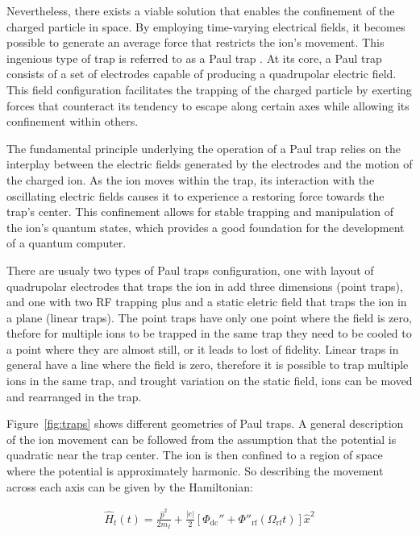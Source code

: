 \documentclass[
  journal=largetwo,
  year=2023,
]{cup-journal}
\begin{document}
Nevertheless, there exists a viable solution that enables the confinement of the charged particle in space. By employing time-varying electrical fields, it becomes possible to generate an average force that restricts the ion's movement. This ingenious type of trap is referred to as a Paul trap \autocite{paul_1953_notizen}. At its core, a Paul trap consists of a set of electrodes capable of producing a quadrupolar electric field. This field configuration facilitates the trapping of the charged particle by exerting forces that counteract its tendency to escape along certain axes while allowing its confinement within others.

The fundamental principle underlying the operation of a Paul trap relies on the interplay between the electric fields generated by the electrodes and the motion of the charged ion. As the ion moves within the trap, its interaction with the oscillating electric fields causes it to experience a restoring force towards the trap's center. This confinement allows for stable trapping and manipulation of the ion's quantum states, which provides a good foundation for the development of a quantum computer.

There are usualy two types of Paul traps configuration, one with layout of quadrupolar electrodes that traps the ion in add three dimensions (point traps), and one with two RF trapping plus and a static eletric field that traps the ion in a plane (linear traps).
The point traps have only one point where the field is zero, thefore for multiple ions to be trapped in the same trap they need to be cooled to a point where they are almost still, or it leads to lost of fidelity.
Linear traps in general have a line where the field is zero, therefore it is possible to trap multiple ions in the same trap, and trought variation on the static field, ions can be moved and rearranged in the trap.

Figure~\ref{fig:traps} shows different geometries of Paul traps. A general description of the ion movement \autocite{leibfried_2003_quantum} can be followed from the assumption that the potential is quadratic near the trap center. The ion is then confined to a region of space where the potential is approximately harmonic. So describing the movement across each axis can be given by the Hamiltonian:

\begin{equation}
  \begin{aligned}\label{eq:ionhamilt}
    \hat{H}_t(t) = \frac{\hat{p}^{2}}{2m_I} + \frac{|e|}{2}[\Phi_{\mathrm{dc}}'' + \Phi''_{\mathrm{rf}}(\Omega_{\mathrm{rf}}t)]\hat{x}^2
  \end{aligned}
\end{equation}
\end{document}
